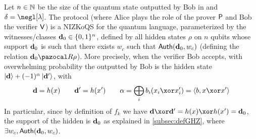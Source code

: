 

\begin{theorem}[NIZKoQS]\label{thm:NIZKoQS}
  Let $n \in \N$ be the size of the quantum state outputted by Bob in \blindZK{} and $\delta=\negl[\lambda]$. The protocol \blindZK{} (where Alice plays the role of the prover $\P$ and Bob the verifier $\V$) is a NIZKoQS for the quantum language, parameterized by the witnesses/classes $\vect{d}_0 \in \{0,1\}^n$, defined by all hidden \GHZ{} states $\rho$ on $n$ qubits whose support $\vect{d}_0$ is such that there exists $w_c$ such that $\Auth(\vect{d}_0, w_c)$ (defining the relation $\vect{d}_0 \cR \rho$). More precisely, when the verifier Bob accepts, with overwhelming probability the outputted by Bob is the hidden \GHZ{} state $\ket{\vect{d}}+(-1)^\alpha\ket{\vect{d}'}$, with
  \begin{align}
    \vect{d} = h(x) \qquad \vect{d}'= h(x') \qquad \alpha = \bigoplus_i b_i (x_i \xor x'_i) = \langle b, x \xor x'\rangle
  \end{align}
  In particular, since by definition of $f_k$ we have $\vect{d} \xor \vect{d}' = h(x) \xor h(x') = \vect{d}_0$, the support of the hidden \GHZ{} is $\vect{d}_0$ as explained in \cref{subsec:defGHZ}, where $\exists w_c, \Auth(\vect{d}_0,w_c)$.
\end{theorem}
